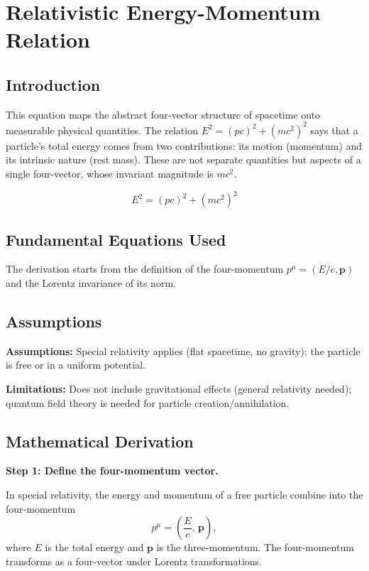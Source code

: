 \chapter{Relativistic Energy-Momentum Relation}

\section*{Introduction}

This equation maps the abstract four-vector structure of spacetime onto measurable physical quantities. The relation $E^2 = (pc)^2 + (mc^2)^2$ says that a particle's total energy comes from two contributions: its motion (momentum) and its intrinsic nature (rest mass). These are not separate quantities but aspects of a single four-vector, whose invariant magnitude is $mc^2$.


\begin{equation}
E^2 = (pc)^2 + (mc^2)^2
\end{equation}

\section*{Fundamental Equations Used}

The derivation starts from the definition of the four-momentum $p^\mu = (E/c, \mathbf{p})$ and the Lorentz invariance of its norm.

\section*{Assumptions}

\textbf{Assumptions:} Special relativity applies (flat spacetime, no gravity); the particle is free or in a uniform potential.


\textbf{Limitations:} Does not include gravitational effects (general relativity needed); quantum field theory is needed for particle creation/annihilation.


\section*{Mathematical Derivation}

\textbf{Step 1: Define the four-momentum vector.}

In special relativity, the energy and momentum of a free particle combine into the four-momentum
\begin{equation}
p^\mu = \left(\frac{E}{c},\,\mathbf{p}\right),
\end{equation}
where $E$ is the total energy and $\mathbf{p}$ is the three-momentum. The four-momentum transforms as a four-vector under Lorentz transformations.

